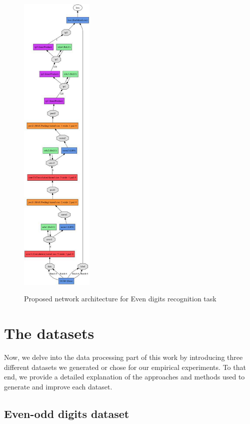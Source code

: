 \begin{figure}[H]
  \centering
   {\includegraphics[width=0.31\textwidth]{images/model}}
	\caption{Proposed network architecture for Even digits recognition task}
	\label{fig:ucsdnet}
\end{figure}

\section{The datasets}
\label{dataha}
Now, we delve into the data processing part of this work by introducing three different datasets we generated or chose for our empirical experiments. To that end, we provide a detailed explanation of the approaches and methods used to generate and improve each dataset.

\subsection{Even-odd digits dataset}
\label{subsubsec:digit}

